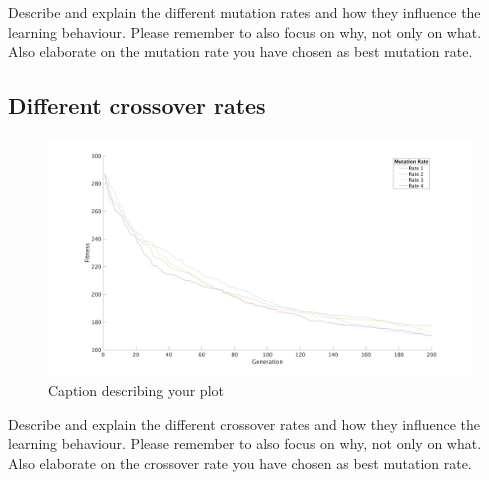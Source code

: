 \documentclass[a4paper, 12pt]{article}
\begin{document}
Describe and explain the different mutation rates and how they influence the learning behaviour. Please remember to also focus on why, not only on what.
Also elaborate on the mutation rate you have chosen as best mutation rate.

\newpage

\subsection{Different crossover rates}


\begin{figure}[ht!]
  \centering
  \includegraphics[width=1.0\textwidth]{images/mutfig}
    \caption{Caption describing your plot \label{fig:mutfig}}
\end{figure}

Describe and explain the different crossover rates and how they influence the learning behaviour. Please remember to also focus on why, not only on what.
Also elaborate on the crossover rate you have chosen as best mutation rate.
\end{document}
